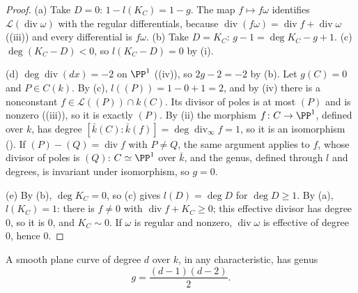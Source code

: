 \begin{proof}
(a) Take $D=0$: $1-l(K_C)=1-g$. The map $f\mapsto f\omega$ identifies $\mathcal L(\operatorname{div}\omega)$ with the regular differentials, because
$\operatorname{div}(f\omega)=\operatorname{div}f+\operatorname{div}\omega$ ((iii)) and every differential is $f\omega$. (b) Take $D=K_C$:
$g-1=\deg K_C-g+1$. (c) $\deg(K_C-D)<0$, so $l(K_C-D)=0$ by (i).

(d) $\deg\operatorname{div}(dx)=-2$ on $\PP^1$ ((iv)), so $2g-2=-2$ by (b). Let $g(C)=0$ and $P\in C(k)$. By (c),
$l((P))=1-0+1=2$, and by (iv) there is a nonconstant $f\in\mathcal L((P))\cap k(C)$. Its divisor of poles is at most $(P)$ and is
nonzero ((iii)), so it is exactly $(P)$. By (ii) the morphism $f\colon C\to\PP^1$, defined over $k$,
has degree $[\bar k(C):\bar k(f)]=\deg\operatorname{div}_\infty f=1$, so it is an isomorphism (). If $(P)-(Q)=\operatorname{div}f$ with $P\ne Q$,
the same argument applies to $f$, whose divisor of poles is $(Q)$: $C\simeq\PP^1$ over $\bar k$, and the genus, defined through $l$ and degrees, is invariant
under isomorphism, so $g=0$.

(e) By (b), $\deg K_C=0$, so (c) gives $l(D)=\deg D$ for $\deg D\ge1$. By (a), $l(K_C)=1$: there is $f\ne0$ with $\operatorname{div}f+K_C\ge0$; this effective divisor
has degree $0$, so it is $0$, and $K_C\sim0$. If $\omega$ is regular and nonzero, $\operatorname{div}\omega$ is effective of degree $0$, hence $0$.
\end{proof}

\begin{theorem}\label{thm:curves:plane-genus}
A smooth plane curve of degree $d$ over $k$, in any characteristic, has genus
\[
g=\frac{(d-1)(d-2)}2.
\]
\end{theorem}


